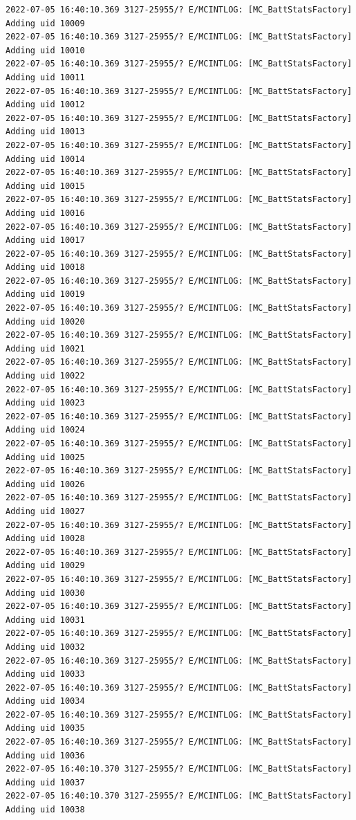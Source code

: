 \documentclass[a4paper,12pt]{book}
\begin{document}
\begin{lstlisting}
2022-07-05 16:40:10.369 3127-25955/? E/MCINTLOG: [MC_BattStatsFactory] Adding uid 10009
2022-07-05 16:40:10.369 3127-25955/? E/MCINTLOG: [MC_BattStatsFactory] Adding uid 10010
2022-07-05 16:40:10.369 3127-25955/? E/MCINTLOG: [MC_BattStatsFactory] Adding uid 10011
2022-07-05 16:40:10.369 3127-25955/? E/MCINTLOG: [MC_BattStatsFactory] Adding uid 10012
2022-07-05 16:40:10.369 3127-25955/? E/MCINTLOG: [MC_BattStatsFactory] Adding uid 10013
2022-07-05 16:40:10.369 3127-25955/? E/MCINTLOG: [MC_BattStatsFactory] Adding uid 10014
2022-07-05 16:40:10.369 3127-25955/? E/MCINTLOG: [MC_BattStatsFactory] Adding uid 10015
2022-07-05 16:40:10.369 3127-25955/? E/MCINTLOG: [MC_BattStatsFactory] Adding uid 10016
2022-07-05 16:40:10.369 3127-25955/? E/MCINTLOG: [MC_BattStatsFactory] Adding uid 10017
2022-07-05 16:40:10.369 3127-25955/? E/MCINTLOG: [MC_BattStatsFactory] Adding uid 10018
2022-07-05 16:40:10.369 3127-25955/? E/MCINTLOG: [MC_BattStatsFactory] Adding uid 10019
2022-07-05 16:40:10.369 3127-25955/? E/MCINTLOG: [MC_BattStatsFactory] Adding uid 10020
2022-07-05 16:40:10.369 3127-25955/? E/MCINTLOG: [MC_BattStatsFactory] Adding uid 10021
2022-07-05 16:40:10.369 3127-25955/? E/MCINTLOG: [MC_BattStatsFactory] Adding uid 10022
2022-07-05 16:40:10.369 3127-25955/? E/MCINTLOG: [MC_BattStatsFactory] Adding uid 10023
2022-07-05 16:40:10.369 3127-25955/? E/MCINTLOG: [MC_BattStatsFactory] Adding uid 10024
2022-07-05 16:40:10.369 3127-25955/? E/MCINTLOG: [MC_BattStatsFactory] Adding uid 10025
2022-07-05 16:40:10.369 3127-25955/? E/MCINTLOG: [MC_BattStatsFactory] Adding uid 10026
2022-07-05 16:40:10.369 3127-25955/? E/MCINTLOG: [MC_BattStatsFactory] Adding uid 10027
2022-07-05 16:40:10.369 3127-25955/? E/MCINTLOG: [MC_BattStatsFactory] Adding uid 10028
2022-07-05 16:40:10.369 3127-25955/? E/MCINTLOG: [MC_BattStatsFactory] Adding uid 10029
2022-07-05 16:40:10.369 3127-25955/? E/MCINTLOG: [MC_BattStatsFactory] Adding uid 10030
2022-07-05 16:40:10.369 3127-25955/? E/MCINTLOG: [MC_BattStatsFactory] Adding uid 10031
2022-07-05 16:40:10.369 3127-25955/? E/MCINTLOG: [MC_BattStatsFactory] Adding uid 10032
2022-07-05 16:40:10.369 3127-25955/? E/MCINTLOG: [MC_BattStatsFactory] Adding uid 10033
2022-07-05 16:40:10.369 3127-25955/? E/MCINTLOG: [MC_BattStatsFactory] Adding uid 10034
2022-07-05 16:40:10.369 3127-25955/? E/MCINTLOG: [MC_BattStatsFactory] Adding uid 10035
2022-07-05 16:40:10.369 3127-25955/? E/MCINTLOG: [MC_BattStatsFactory] Adding uid 10036
2022-07-05 16:40:10.370 3127-25955/? E/MCINTLOG: [MC_BattStatsFactory] Adding uid 10037
2022-07-05 16:40:10.370 3127-25955/? E/MCINTLOG: [MC_BattStatsFactory] Adding uid 10038

\end{lstlisting}
\end{document}
